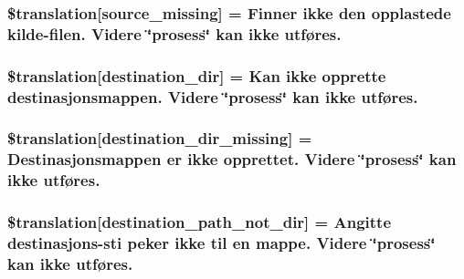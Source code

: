 \subsubsection[{\$translation}]{\setlength{\rightskip}{0pt plus 5cm}\$translation\mbox{[}\textquotesingle{}source\+\_\+missing\textquotesingle{}\mbox{]} = \textquotesingle{}Finner ikke den opplastede kilde-\/filen. Videre \char`\"{}prosess\char`\"{} kan ikke utføres.\textquotesingle{}}\label{class_8upload_8no___n_o_8php_aceaaf7355acaaf10f0ae60378d03c468}
\hypertarget{class_8upload_8no___n_o_8php_aff2427c72a2598aefa6d58df1dd18b08}{}
\subsubsection[{\$translation}]{\setlength{\rightskip}{0pt plus 5cm}\$translation\mbox{[}\textquotesingle{}destination\+\_\+dir\textquotesingle{}\mbox{]} = \textquotesingle{}Kan ikke opprette destinasjonsmappen. Videre \char`\"{}prosess\char`\"{} kan ikke utføres.\textquotesingle{}}\label{class_8upload_8no___n_o_8php_aff2427c72a2598aefa6d58df1dd18b08}
\hypertarget{class_8upload_8no___n_o_8php_a9ef28d3cf09942c6c0a1e77fa09185e8}{}
\subsubsection[{\$translation}]{\setlength{\rightskip}{0pt plus 5cm}\$translation\mbox{[}\textquotesingle{}destination\+\_\+dir\+\_\+missing\textquotesingle{}\mbox{]} = \textquotesingle{}Destinasjonsmappen er ikke opprettet. Videre \char`\"{}prosess\char`\"{} kan ikke utføres.\textquotesingle{}}\label{class_8upload_8no___n_o_8php_a9ef28d3cf09942c6c0a1e77fa09185e8}
\hypertarget{class_8upload_8no___n_o_8php_a5704a67137126e8c87b7a364175929d4}{}
\subsubsection[{\$translation}]{\setlength{\rightskip}{0pt plus 5cm}\$translation\mbox{[}\textquotesingle{}destination\+\_\+path\+\_\+not\+\_\+dir\textquotesingle{}\mbox{]} = \textquotesingle{}Angitte destinasjons-\/sti peker ikke til en mappe. Videre \char`\"{}prosess\char`\"{} kan ikke utføres.\textquotesingle{}}\label{class_8upload_8no___n_o_8php_a5704a67137126e8c87b7a364175929d4}
\hypertarget{class_8upload_8no___n_o_8php_a97608ea194a616db49141a0e6dee900c}{}
